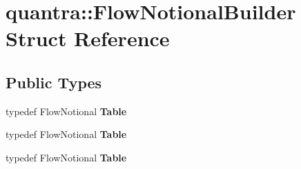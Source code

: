 \hypertarget{structquantra_1_1FlowNotionalBuilder}{}\section{quantra\+:\+:Flow\+Notional\+Builder Struct Reference}
\label{structquantra_1_1FlowNotionalBuilder}
\subsection*{Public Types}
\begin{DoxyCompactItemize}
\item 
\mbox{\label{structquantra_1_1FlowNotionalBuilder_acc37647d785754cd07d728c2ce3d8d2b}} 
typedef Flow\+Notional {\bfseries Table}
\item 
\mbox{\label{structquantra_1_1FlowNotionalBuilder_acc37647d785754cd07d728c2ce3d8d2b}} 
typedef Flow\+Notional {\bfseries Table}
\item 
\mbox{\label{structquantra_1_1FlowNotionalBuilder_acc37647d785754cd07d728c2ce3d8d2b}} 
typedef Flow\+Notional {\bfseries Table}
\end{DoxyCompactItemize}
